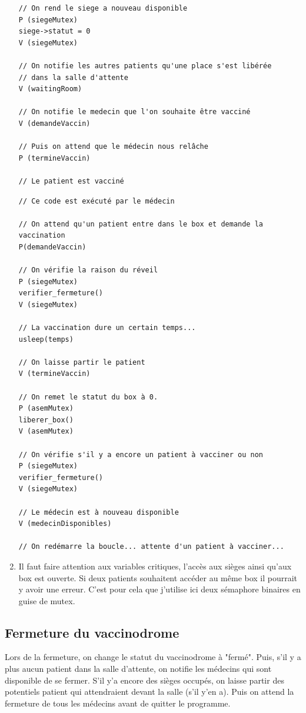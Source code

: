 \documentclass[a4paper]{article}
\begin{document}
\begin{enumerate}
\begin{verbatim}
// On rend le siege a nouveau disponible
P (siegeMutex)
siege->statut = 0
V (siegeMutex)

// On notifie les autres patients qu'une place s'est libérée
// dans la salle d'attente
V (waitingRoom)

// On notifie le medecin que l'on souhaite être vacciné
V (demandeVaccin)

// Puis on attend que le médecin nous relâche
P (termineVaccin)

// Le patient est vacciné
\end{verbatim}
\newpage

\begin{verbatim}
// Ce code est exécuté par le médecin

// On attend qu'un patient entre dans le box et demande la vaccination
P(demandeVaccin)

// On vérifie la raison du réveil
P (siegeMutex)
verifier_fermeture()
V (siegeMutex)

// La vaccination dure un certain temps...
usleep(temps)

// On laisse partir le patient
V (termineVaccin)

// On remet le statut du box à 0.
P (asemMutex)
liberer_box()
V (asemMutex)

// On vérifie s'il y a encore un patient à vacciner ou non
P (siegeMutex)
verifier_fermeture()
V (siegeMutex)

// Le médecin est à nouveau disponible
V (medecinDisponibles)

// On redémarre la boucle... attente d'un patient à vacciner...

\end{verbatim}

  \item Il faut faire attention aux variables critiques, l'accès aux sièges ainsi qu'aux box est ouverte. Si deux patients souhaitent accéder au même box il pourrait y avoir une erreur. C'est pour cela que j'utilise ici deux sémaphore binaires en guise de mutex.
  \end{enumerate}
\newpage

\subsection{Fermeture du vaccinodrome}

  Lors de la fermeture, on change le statut du vaccinodrome à "fermé".
  Puis, s'il y a plus aucun patient dans la salle d'attente, on notifie les médecins qui sont disponible de se fermer. S'il y'a encore des sièges occupés, on laisse partir des potentiels patient qui attendraient devant la salle (s'il y'en a). Puis on attend la fermeture de tous les médecins avant de quitter le programme.
\end{document}
